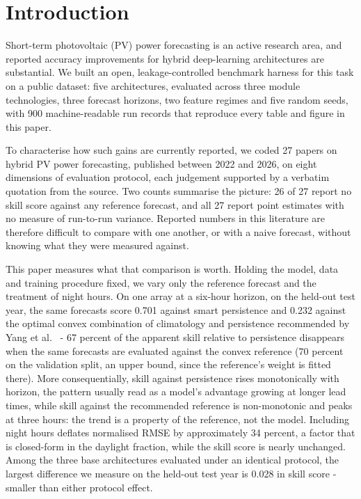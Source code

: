 \section{Introduction}
\label{sec:intro}

Short-term photovoltaic (PV) power forecasting is an active research
area, and reported accuracy improvements for hybrid deep-learning
architectures are substantial. We built an open, leakage-controlled
benchmark harness for this task on a public dataset: five
architectures, evaluated across three module technologies, three
forecast horizons, two feature regimes and five random seeds, with 900
machine-readable run records that reproduce every table and figure in
this paper.

To characterise how such gains are currently reported, we coded 27
papers on hybrid PV power forecasting, published between 2022 and
2026, on eight dimensions of evaluation protocol, each judgement
supported by a verbatim quotation from the source. Two counts
summarise the picture: 26 of 27 report no skill score against any
reference forecast, and all 27 report point estimates with no measure
of run-to-run variance. Reported numbers in this literature are
therefore difficult to compare with one another, or with a naive
forecast, without knowing what they were measured against.

This paper measures what that comparison is worth. Holding the model,
data and training procedure fixed, we vary only the reference forecast
and the treatment of night hours. On one array at a six-hour horizon,
on the held-out test year, the same forecasts score 0.701 against
smart persistence and 0.232 against the optimal convex combination of
climatology and persistence recommended by Yang et
al.~\cite{yang2020verification} - 67 percent of the apparent skill
relative to persistence disappears when the same forecasts are
evaluated against the convex reference (70 percent on the validation
split, an upper bound, since the reference's weight is fitted there).
More consequentially, skill against persistence rises monotonically
with horizon, the pattern usually read as a model's advantage growing
at longer lead times, while skill against the recommended reference is
non-monotonic and peaks at three hours: the trend is a property of the
reference, not the model. Including night hours deflates normalised
RMSE by approximately 34 percent, a factor that is closed-form in the
daylight fraction, while the skill score is nearly unchanged. Among
the three base architectures evaluated under an identical protocol,
the largest difference we measure on the held-out test year is 0.028
in skill score - smaller than either protocol effect.

